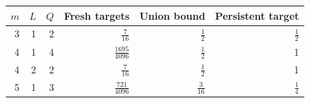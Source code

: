 \begin{tabular}{rrrrrr}
\toprule
$m$ & $L$ & $Q$ & Fresh targets & Union bound & Persistent target \\
\midrule
3 & 1 & 2 & $\frac{7}{16}$ & $\frac{1}{2}$ & $\frac{1}{2}$ \\
4 & 1 & 4 & $\frac{1695}{4096}$ & $\frac{1}{2}$ & 1 \\
4 & 2 & 2 & $\frac{7}{16}$ & $\frac{1}{2}$ & 1 \\
5 & 1 & 3 & $\frac{721}{4096}$ & $\frac{3}{16}$ & $\frac{1}{4}$ \\
\bottomrule
\end{tabular}
